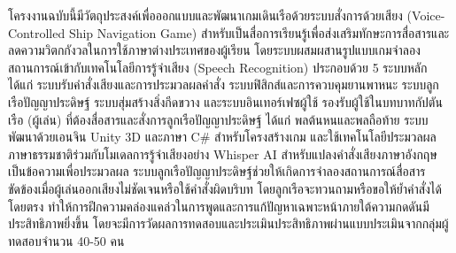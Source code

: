 โครงงานฉบับนี้มีวัตถุประสงค์เพื่อออกแบบและพัฒนาเกมเดินเรือด้วยระบบสั่งการด้วยเสียง (Voice-Controlled Ship Navigation Game) สำหรับเป็นสื่อการเรียนรู้เพื่อส่งเสริมทักษะการสื่อสารและลดความวิตกกังวลในการใช้ภาษาต่างประเทศของผู้เรียน โดยระบบผสมผสานรูปแบบเกมจำลองสถานการณ์เข้ากับเทคโนโลยีการรู้จำเสียง (Speech Recognition) ประกอบด้วย 5 ระบบหลัก ได้แก่ ระบบรับคำสั่งเสียงและการประมวลผลคำสั่ง ระบบฟิสิกส์และการควบคุมยานพาหนะ ระบบลูกเรือปัญญาประดิษฐ์ ระบบสุ่มสร้างสิ่งกีดขวาง และระบบอินเทอร์เฟซผู้ใช้ รองรับผู้ใช้ในบทบาทกัปตันเรือ (ผู้เล่น) ที่ต้องสื่อสารและสั่งการลูกเรือปัญญาประดิษฐ์ ได้แก่ พลต้นหนและพลถือท้าย ระบบพัฒนาด้วยเอนจิน Unity 3D และภาษา C\# สำหรับโครงสร้างเกม และใช้เทคโนโลยีประมวลผลภาษาธรรมชาติร่วมกับโมเดลการรู้จำเสียงอย่าง Whisper AI สำหรับแปลงคำสั่งเสียงภาษาอังกฤษเป็นข้อความเพื่อประมวลผล ระบบลูกเรือปัญญาประดิษฐ์ช่วยให้เกิดการจำลองสถานการณ์สื่อสารขัดข้องเมื่อผู้เล่นออกเสียงไม่ชัดเจนหรือใช้คำสั่งผิดบริบท โดยลูกเรือจะทวนถามหรือขอให้ย้ำคำสั่งได้โดยตรง ทำให้การฝึกความคล่องแคล่วในการพูดและการแก้ปัญหาเฉพาะหน้าภายใต้ความกดดันมีประสิทธิภาพยิ่งขึ้น โดยจะมีการวัดผลการทดสอบและประเมินประสิทธิภาพผ่านแบบประเมินจากกลุ่มผู้ทดสอบจำนวน 40-50 คน